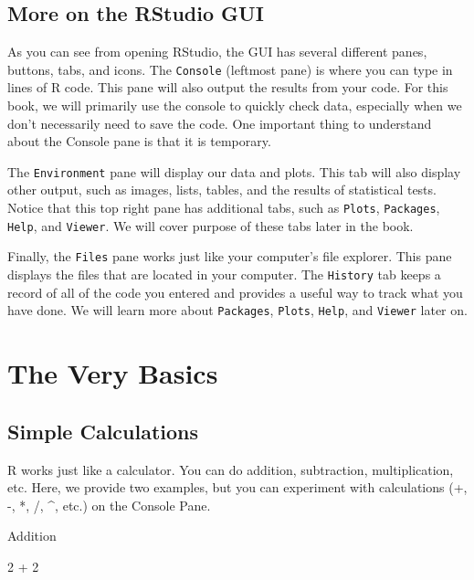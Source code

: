 \documentclass[
]{book}
\newenvironment{Shaded}{\begin{snugshade}}{\end{snugshade}}
\newcommand{\DecValTok}[1]{\textcolor[rgb]{0.00,0.00,0.81}{#1}}
\newcommand{\SpecialCharTok}[1]{\textcolor[rgb]{0.00,0.00,0.00}{#1}}
\begin{document}
\hypertarget{more-on-the-rstudio-gui}{%
\subsection{More on the RStudio GUI}\label{more-on-the-rstudio-gui}}

As you can see from opening RStudio, the GUI has several different panes, buttons, tabs, and icons. The \texttt{Console} (leftmost pane) is where you can type in lines of R code. This pane will also output the results from your code. For this book, we will primarily use the console to quickly check data, especially when we don't necessarily need to save the code. One important thing to understand about the Console pane is that it is temporary.

The \texttt{Environment} pane will display our data and plots. This tab will also display other output, such as images, lists, tables, and the results of statistical tests. Notice that this top right pane has additional tabs, such as \texttt{Plots}, \texttt{Packages}, \texttt{Help}, and \texttt{Viewer}. We will cover purpose of these tabs later in the book.

Finally, the \texttt{Files} pane works just like your computer's file explorer. This pane displays the files that are located in your computer. The \texttt{History} tab keeps a record of all of the code you entered and provides a useful way to track what you have done. We will learn more about \texttt{Packages}, \texttt{Plots}, \texttt{Help}, and \texttt{Viewer} later on.

\hypertarget{the-very-basics}{%
\section{The Very Basics}\label{the-very-basics}}

\hypertarget{simple-calculations}{%
\subsection{Simple Calculations}\label{simple-calculations}}

R works just like a calculator. You can do addition, subtraction, multiplication, etc. Here, we provide two examples, but you can experiment with calculations (+, -, *, /, \^{}, etc.) on the Console Pane.

Addition

\begin{Shaded}
\begin{Highlighting}[]
\DecValTok{2} \SpecialCharTok{+} \DecValTok{2}
\end{Highlighting}
\end{Shaded}
\end{document}
